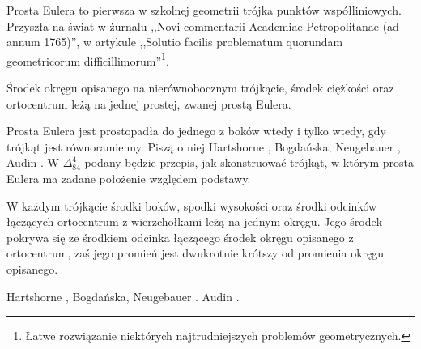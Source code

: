 %

Prosta Eulera to pierwsza w szkolnej geometrii trójka punktów współliniowych.
Przyszła na świat w żurnalu ,,Novi commentarii Academiae Petropolitanae (ad annum 1765)'', w artykule ,,Solutio facilis problematum quorundam geometricorum difficillimorum''\footnote{Łatwe rozwiązanie niektórych najtrudniejszych problemów geometrycznych.}.

\begin{proposition}
	\label{prosta_eulera}
	Środek okręgu opisanego na nierównobocznym trójkącie, środek ciężkości oraz ortocentrum leżą na jednej prostej, zwanej prostą Eulera.
\end{proposition}

Prosta Eulera jest prostopadła do jednego z boków wtedy i tylko wtedy, gdy trójkąt jest równoramienny.
Piszą o niej Hartshorne \cite[s. 54, 55]{hartshorne2000}, Bogdańska, Neugebauer \cite[s. 84]{neugebauer_2018}, Audin \cite[s. 61]{audin_2003}.
W $\Delta_{84}^{4}$ podany będzie przepis, jak skonstruować trójkąt, w którym prosta Eulera ma zadane położenie względem podstawy.

\begin{proposition}
	\label{okrag_dziewieciu_punktow}
	W każdym trójkącie środki boków, spodki wysokości oraz środki odcinków łączących ortocentrum z wierzchołkami leżą na jednym okręgu.
	Jego środek pokrywa się ze środkiem odcinka łączącego środek okręgu opisanego z ortocentrum, zaś jego promień jest dwukrotnie krótszy od promienia okręgu opisanego.
\end{proposition}


Hartshorne \cite[s. 57, 60]{hartshorne2000}, Bogdańska, Neugebauer \cite[s. 85, 86]{neugebauer_2018}.
Audin \cite[s. 62]{audin_2003}.

